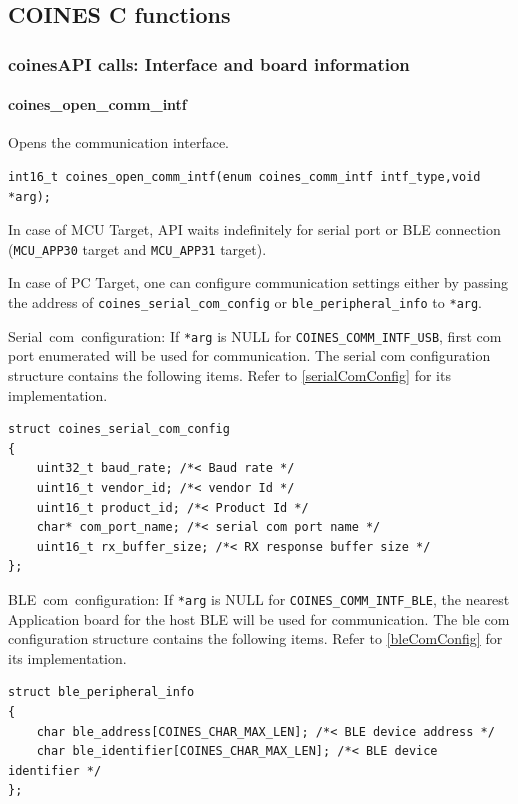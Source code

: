 \subsection{COINES C functions}\label{CoinesCFunctions}
\subsubsection{coinesAPI calls: Interface and board information}

\paragraph{coines\_open\_comm\_intf}
Opens the communication interface.

\begin{lstlisting}
int16_t coines_open_comm_intf(enum coines_comm_intf intf_type,void *arg); 
\end{lstlisting}

In case of MCU Target, API waits indefinitely for serial port or BLE connection (\texttt{MCU\_APP30} target and \texttt{MCU\_APP31} target).

In case of PC Target, one can configure communication settings either by passing the address of \texttt{coines\_serial\_com\_config} or \texttt{ble\_peripheral\_info} to \texttt{*arg}.

Serial\ com\ configuration:
\newline If \texttt{*arg} is NULL for \texttt{COINES\_COMM\_INTF\_USB}, first com port enumerated will be used for communication.
The serial com configuration structure contains the following items. Refer to \ref{serialComConfig} for its implementation.

\begin{lstlisting}
struct coines_serial_com_config
{
	uint32_t baud_rate; /*< Baud rate */
	uint16_t vendor_id; /*< vendor Id */
	uint16_t product_id; /*< Product Id */
	char* com_port_name; /*< serial com port name */
	uint16_t rx_buffer_size; /*< RX response buffer size */
};
\end{lstlisting}

BLE\ com\ configuration:
\newline If \texttt{*arg} is NULL for \texttt{COINES\_COMM\_INTF\_BLE}, the nearest Application board for the host BLE will be used for communication.
The ble com configuration structure contains the following items. Refer to \ref{bleComConfig} for its implementation.

\begin{lstlisting}
struct ble_peripheral_info
{
	char ble_address[COINES_CHAR_MAX_LEN]; /*< BLE device address */
	char ble_identifier[COINES_CHAR_MAX_LEN]; /*< BLE device identifier */
};
\end{lstlisting}

